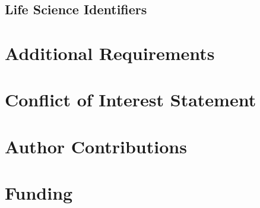 \documentclass[utf8]{frontiersSCNS} %
\begin{document}
\subsection{Life Science Identifiers}


\section{Additional Requirements}


\section*{Conflict of Interest Statement}


\section*{Author Contributions}


\section*{Funding}
\end{document}
